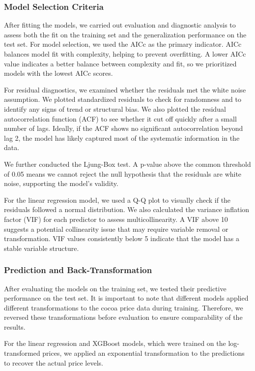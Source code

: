 \documentclass[10pt]{article}
\begin{document}
\subsubsection{Model Selection Criteria}
After fitting the models, we carried out evaluation and diagnostic analysis to assess both the fit on the training set and the generalization performance on the test set. For model selection, we used the AICc as the primary indicator. AICc balances model fit with complexity, helping to prevent overfitting. A lower AICc value indicates a better balance between complexity and fit, so we prioritized models with the lowest AICc scores.

\noindent
For residual diagnostics, we examined whether the residuals met the white noise assumption. We plotted standardized residuals to check for randomness and to identify any signs of trend or structural bias. We also plotted the residual autocorrelation function (ACF) to see whether it cut off quickly after a small number of lags. Ideally, if the ACF shows no significant autocorrelation beyond lag 2, the model has likely captured most of the systematic information in the data.

\noindent
We further conducted the Ljung-Box test. A p-value above the common threshold of 0.05 means we cannot reject the null hypothesis that the residuals are white noise, supporting the model’s validity.

\noindent
For the linear regression model, we used a Q-Q plot to visually check if the residuals followed a normal distribution. We also calculated the variance inflation factor (VIF) for each predictor to assess multicollinearity. A VIF above 10 suggests a potential collinearity issue that may require variable removal or transformation. VIF values consistently below 5 indicate that the model has a stable variable structure.

\subsubsection{Prediction and Back-Transformation}
After evaluating the models on the training set, we tested their predictive performance on the test set. It is important to note that different models applied different transformations to the cocoa price data during training. Therefore, we reversed these transformations before evaluation to ensure comparability of the results.

\noindent
For the linear regression and XGBoost models, which were trained on the log-transformed prices, we applied an exponential transformation to the predictions to recover the actual price levels.
\end{document}
